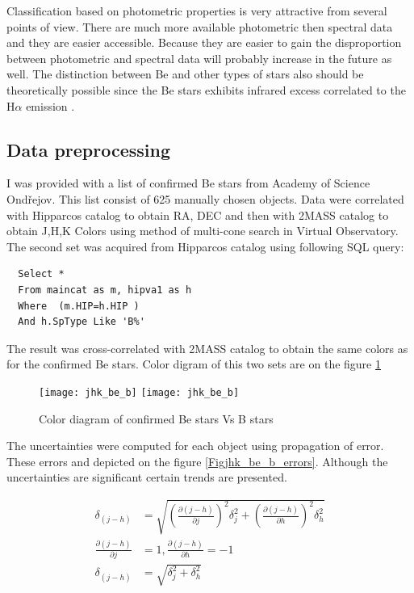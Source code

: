 Classification based on photometric properties is very attractive from
several points of view. There are much more available photometric then
spectral data and they are easier accessible. Because they are easier
to gain the disproportion between photometric and spectral data will
probably increase in the future as well. The distinction between Be
and other types of stars also should be theoretically possible since
the Be stars exhibits infrared excess correlated to the H$\alpha$
emission \citep{van1995halpha}.

\subsection{Data preprocessing}

I was provided with a list of confirmed Be stars from Academy of Science
Ondřejov. This list consist of 625 manually chosen objects. Data were
correlated with Hipparcos \citep{perryman1997hipparcos} catalog to
obtain RA, DEC and then with 2MASS\citep{2006AJ131.1163S} catalog to
obtain J,H,K Colors using method of multi-cone search in Virtual
Observatory. The second set was acquired from Hipparcos catalog using
following SQL query:

\begin{lstlisting}
  Select * 
  From maincat as m, hipva1 as h 
  Where  (m.HIP=h.HIP )  
  And h.SpType Like 'B%'
\end{lstlisting}

The result was cross-correlated with 2MASS catalog to obtain the same
colors as for the confirmed Be stars. Color digram of this two sets
are on the figure \ref{Figjhk_be_b}

    \begin{figure}[!htbp]
      \begin{center}
        \leavevmode
        \ifpdf
        \texttt{[image: jhk\_be\_b]}
        \else
        \texttt{[image: jhk\_be\_b]}
        \fi
        \caption{Color diagram of confirmed Be stars Vs B stars}
        \label{Figjhk_be_b}
      \end{center}
    \end{figure}

    The uncertainties were computed for each object using propagation
    of error. These errors and depicted on the figure
    \ref{Figjhk_be_b_errors}. Although the uncertainties are
    significant certain trends are presented.

\begin{align*}
  \delta_{(j - h)} &= \sqrt{\left(\frac{\partial(j - h) }{\partial
        j}\right)^2\delta_j^2 + \left(\frac{\partial(j - h) }{\partial
        h}\right)^2\delta_h^2} \\
  \frac{\partial(j - h) }{\partial j } &= 1,\frac{\partial(j - h)
  }{\partial h } = -1 \\
  \delta_{(j - h)} &= \sqrt{\delta_j^2 + \delta_h^2}
\end{align*}


